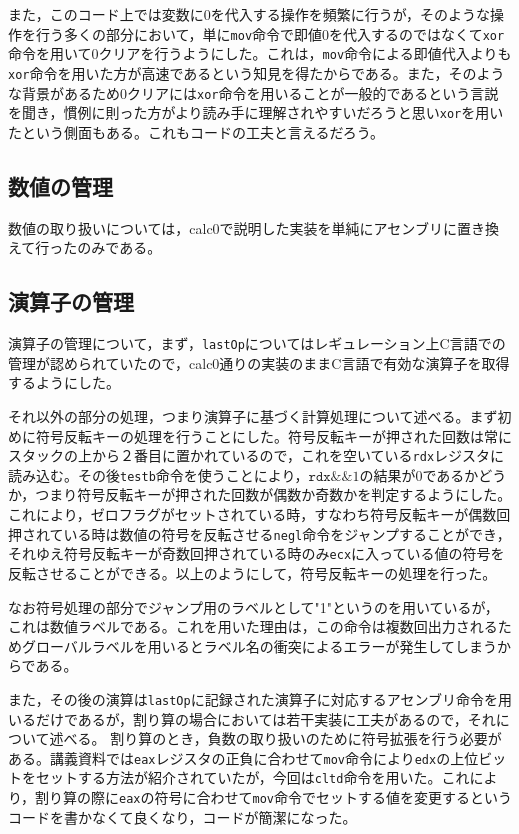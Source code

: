 \documentclass[a4paper]{jsarticle}
\newcommand{\var}[1]{\texttt{#1}}
\begin{document}
また，このコード上では変数に0を代入する操作を頻繁に行うが，そのような操作を行う多くの部分において，単に\var{mov}命令で即値0を代入するのではなくて\var{xor}命令を用いて0クリアを行うようにした。これは，\var{mov}命令による即値代入よりも\var{xor}命令を用いた方が高速であるという知見を得たからである。また，そのような背景があるため0クリアには\var{xor}命令を用いることが一般的であるという言説を聞き，慣例に則った方がより読み手に理解されやすいだろうと思い\var{xor}を用いたという側面もある。これもコードの工夫と言えるだろう。

\subsection{数値の管理}
数値の取り扱いについては，calc0で説明した実装を単純にアセンブリに置き換えて行ったのみである。

\subsection{演算子の管理}
演算子の管理について，まず，\var{lastOp}についてはレギュレーション上C言語での管理が認められていたので，calc0通りの実装のままC言語で有効な演算子を取得するようにした。

それ以外の部分の処理，つまり演算子に基づく計算処理について述べる。まず初めに符号反転キーの処理を行うことにした。符号反転キーが押された回数は常にスタックの上から２番目に置かれているので，これを空いている\var{rdx}レジスタに読み込む。その後\var{testb}命令を使うことにより，$\var{rdx} \&\& 1$の結果が0であるかどうか，つまり符号反転キーが押された回数が偶数か奇数かを判定するようにした。これにより，ゼロフラグがセットされている時，すなわち符号反転キーが偶数回押されている時は数値の符号を反転させる\var{negl}命令をジャンプすることができ，それゆえ符号反転キーが奇数回押されている時のみ\var{ecx}に入っている値の符号を反転させることができる。以上のようにして，符号反転キーの処理を行った。

なお符号処理の部分でジャンプ用のラベルとして"1"というのを用いているが，これは数値ラベルである。これを用いた理由は，この命令は複数回出力されるためグローバルラベルを用いるとラベル名の衝突によるエラーが発生してしまうからである。

また，その後の演算は\var{lastOp}に記録された演算子に対応するアセンブリ命令を用いるだけであるが，割り算の場合においては若干実装に工夫があるので，それについて述べる。
割り算のとき，負数の取り扱いのために符号拡張を行う必要がある。講義資料では\var{eax}レジスタの正負に合わせて\var{mov}命令により\var{edx}の上位ビットをセットする方法が紹介されていたが，今回は\var{cltd}命令を用いた。これにより，割り算の際に\var{eax}の符号に合わせて\var{mov}命令でセットする値を変更するというコードを書かなくて良くなり，コードが簡潔になった。
\end{document}

